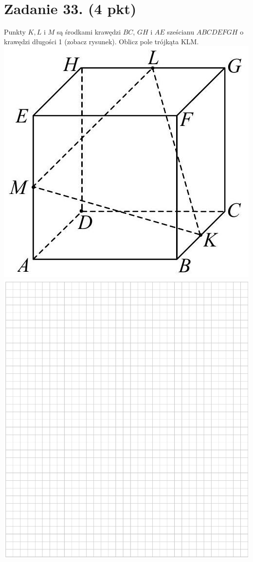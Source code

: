 \documentclass[10pt]{article}
\begin{document}
\section*{Zadanie 33. (4 pkt)}
Punkty \(K, L\) i \(M\) są środkami krawędzi \(B C\), \(G H\) i \(A E\) sześcianu \(A B C D E F G H\) o krawędzi długości 1 (zobacz rysunek). Oblicz pole trójkąta KLM.\\
\includegraphics[max width=\textwidth, center]{2024_11_21_5b6b7ffa9006e3f448adg-18}\\
\includegraphics[max width=\textwidth, center]{2024_11_21_5b6b7ffa9006e3f448adg-18(1)}\\
\end{document}
